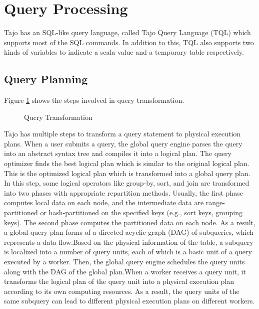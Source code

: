 \documentclass[9pt,twocolumn,twoside]{../../styles/osajnl}
\begin{document}
\section{Query Processing}
Tajo has an SQL-like query language, called Tajo Query Language (TQL)
\cite{www-apache-tajo-tsql} which supports most of the SQL
commands. In addition to this, TQL also supports two kinds of
variables to indicate a scala value and a temporary table
respectively.

\subsection{Query Planning}

Figure \ref{fig:queryplanning} shows the steps involved in query transformation. 

\begin{figure}[htbp]
\centering
{}
\caption{\cite{tajo-paper} Query Transformation}
\label{fig:queryplanning}
\end{figure}

\noindent
Tajo has multiple steps to transform a query statement to physical
execution plans. When a user submits a query, the global query engine
parses the query into an abstract syntax tree and compiles it into a
logical plan. The query optimizer finds the best logical plan which is
similar to the original logical plan. This is the optimized logical
plan which is transformed into a global query plan. In this step, some
logical operators like group-by, sort, and join are transformed into
two phases with appropriate repartition methods. Usually, the first
phase computes local data on each node, and the intermediate data are
range-partitioned or hash-partitioned on the specified keys (e.g.,
sort keys, grouping keys). The second phase computes the partitioned
data on each node. As a result, a global query plan forms of a
directed acyclic graph (DAG) of subqueries, which represents a data
flow.Based on the physical information of the table, a subquery is
localized into a number of query units, each of which is a basic unit
of a query executed by a worker. Then, the global query engine
schedules the query units along with the DAG of the global
plan.\newline \newline When a worker receives a query unit, it
transforms the logical plan of the query unit into a physical
execution plan according to its own computing resources. As a result,
the query units of the same subquery can lead to different physical
execution plans on different workers.
\end{document}

